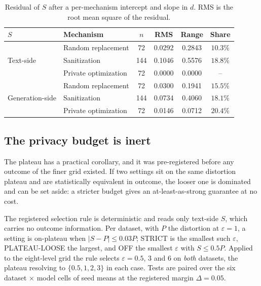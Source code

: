 \begin{table}[t]
  \centering
  \caption{Residual of $S$ after a per-mechanism intercept and slope in $d$. RMS is the root mean square of the residual.}
  \label{tab:residual}
  \begin{tabular}{llcccc}
    \toprule
    $S$ & Mechanism & $n$ & RMS & Range & Share \\
    \midrule
    \multirow{3}{*}{Text-side}
      & Random replacement   & 72 & 0.0292 & 0.2843 & $10.3\%$ \\
      & Sanitization         & 144 & 0.1046 & 0.5576 & $18.8\%$ \\
      & Private optimization & 72 & 0.0000 & 0.0000 & -- \\
    \midrule
    \multirow{3}{*}{Generation-side}
      & Random replacement   & 72 & 0.0300 & 0.1941 & $15.5\%$ \\
      & Sanitization         & 144 & 0.0734 & 0.4060 & $18.1\%$ \\
      & Private optimization & 72 & 0.0146 & 0.0712 & $20.4\%$ \\
    \bottomrule
  \end{tabular}
\end{table}

\subsection{\label{apx:dominated}The privacy budget is inert}
The plateau has a practical corollary,
and it was pre-registered before any outcome of the finer grid existed.
If two settings sit on the same distortion plateau and are statistically equivalent in outcome,
the looser one is dominated and can be set aside:
a stricter budget gives an at-least-as-strong guarantee at no cost.

The registered selection rule is deterministic and reads only text-side $S$,
which carries no outcome information.
Per dataset,
with $P$ the distortion at $\varepsilon = 1$,
a setting is on-plateau when $|S - P| \le 0.03P$;
STRICT is the smallest such $\varepsilon$,
PLATEAU-LOOSE the largest,
and OFF the smallest $\varepsilon$ with $S \le 0.5P$.
Applied to the eight-level grid the rule selects $\varepsilon = 0.5$,
$3$ and $6$ on \textit{both} datasets,
the plateau resolving to $\{0.5, 1, 2, 3\}$ in each case.
Tests are paired over the six dataset $\times$ model cells of seed means at the registered margin $\Delta = 0.05$.

